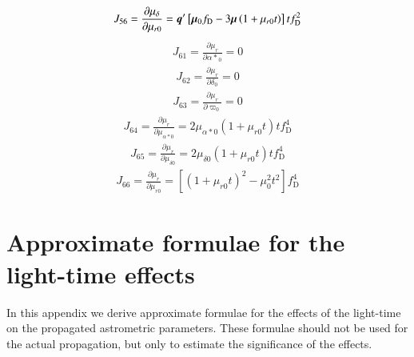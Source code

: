 \documentclass{aa}
\def\vec#1{\ensuremath{\mathchoice{\mbox{\boldmath$\displaystyle#1$}}
{\mbox{\boldmath$\textstyle#1$}}
{\mbox{\boldmath$\scriptstyle#1$}}
{\mbox{\boldmath$\scriptscriptstyle#1$}}}}
\begin{document}
\begin{equation*}
 \begin{aligned}
    J_{56}=\frac{\partial\mu_\delta}{\partial\mu_{r0}}=
    \vec{q}'\left[\vec{\mu}_0f_\mathrm{D}-3\vec{\mu}\left(1+\mu_{r0}t\right)\right]tf_\mathrm{D}^2
 \end{aligned}
\end{equation*}
\begin{equation*}
 \begin{aligned}
    J_{61}=\frac{\partial\mu_r}{\partial{\alpha*}_0}=0
 \end{aligned}
\end{equation*}
\begin{equation*}
 \begin{aligned}
    J_{62}=\frac{\partial\mu_r}{\partial\delta_0}=0
 \end{aligned}
\end{equation*}
\begin{equation*}
 \begin{aligned}
    J_{63}=\frac{\partial\mu_r}{\partial\varpi_0}=0
 \end{aligned}
\end{equation*}
\begin{equation*}
 \begin{aligned}
    J_{64}=\frac{\partial\mu_r}{\partial\mu_{\alpha*0}}=
    2\mu_{\alpha*0}\left(1+\mu_{r0}t\right)tf_\mathrm{D}^4
 \end{aligned}
\end{equation*}
\begin{equation*}
 \begin{aligned}
    J_{65}=\frac{\partial\mu_r}{\partial\mu_{\delta0}}=
    2\mu_{\delta0}\left(1+\mu_{r0}t\right)tf_\mathrm{D}^4
 \end{aligned}
\end{equation*}
\begin{equation*}
 \begin{aligned}
    J_{66}=\frac{\partial\mu_r}{\partial\mu_{r0}}=
    \left[\left(1+\mu_{r0}t\right)^2-\mu_0^2t^2\right]f_\mathrm{D}^4
 \end{aligned}
\end{equation*}


\section{Approximate formulae for the light-time effects}
\label{sec:approx}

In this appendix we derive approximate formulae for the effects of the light-time on
the propagated astrometric parameters. These formulae should not be used for the actual
propagation, but only to estimate the significance of the effects.
\end{document}
